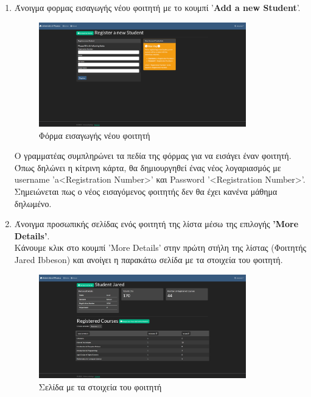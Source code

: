 \documentclass[12pt]{article}
\begin{document}
	\begin{enumerate}
		\item Άνοιγμα φορμας εισαγωγής νέου φοιτητή με το κουμπί '\textbf{Add a new Student}'.\\
		
		\begin{figure}[H]
			\centering
			\includegraphics[width=0.85\textwidth]{creates.png}
			\caption{Φόρμα εισαγωγής νέου φοιτητή}
			\label{fig:emptyView}
		\end{figure}
	
		Ο γραμματέας συμπληρώνει τα πεδία της φόρμας για να εισάγει έναν φοιτητή. Όπως δηλώνει η κίτρινη κάρτα, θα δημιουργηθεί ένας νέος λογαριασμός με username 'a<Registration Number>' και Password '<Registration Number>'. Σημειώνεται πως ο νέος εισαγόμενος φοιτητής δεν θα έχει κανένα μάθημα δηλωμένο.
		
		\item Άνοιγμα προσωπικής σελίδας ενός φοιτητή της λίστα μέσω της επιλογής \textbf{'More Details'}.\\
		Κάνουμε κλικ στο κουμπί 'More Details' στην πρώτη στήλη της λίστας (Φοιτητής Jared Ibbeson) και ανοίγει η παρακάτω σελίδα με τα στοιχεία του φοιτητή.
		
		
		\begin{figure}[H]
			\centering
			\includegraphics[width=0.85\textwidth]{detailss.png}
			\caption{Σελίδα με τα στοιχεία του φοιτητή}
			\label{fig:emptyView}
		\end{figure}
		

\end{enumerate}
\end{document}
